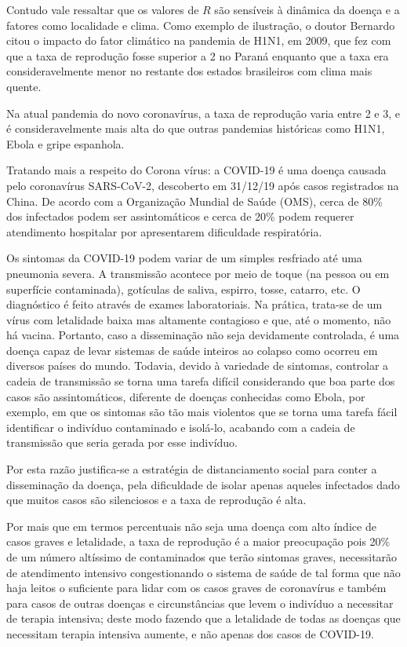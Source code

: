 \documentclass[
	12pt,				%
	openright,			%
	twoside,			%
	a4paper,			%
	english,			%
	brazil,				%
	svgnames
	]{abntex2}\usepackage[]{graphicx}\usepackage[]{color}
\begin{document}
Contudo vale ressaltar que os valores de $R$ são sensíveis à dinâmica da doença e a fatores como localidade e clima. Como exemplo de ilustração, o doutor Bernardo citou o impacto do fator climático na pandemia de H1N1, em 2009, que fez com que a taxa de reprodução fosse superior a 2 no Paraná enquanto que a taxa era consideravelmente menor no restante dos estados brasileiros com clima mais quente.



Na atual pandemia do novo coronavírus, a taxa de reprodução varia entre 2 e 3, e é consideravelmente mais alta do que outras pandemias históricas como H1N1, Ebola e gripe espanhola.



Tratando mais a respeito do Corona vírus: a COVID-19 é uma doença causada pelo coronavírus SARS-CoV-2, descoberto em 31/12/19 após casos registrados na China. De acordo com a Organização Mundial de Saúde (OMS), cerca de 80\% dos infectados podem ser assintomáticos e cerca de 20\% podem requerer atendimento hospitalar por apresentarem dificuldade respiratória. 



Os sintomas da COVID-19 podem variar de um simples resfriado até uma pneumonia severa. A transmissão acontece por meio de toque (na pessoa ou em superfície contaminada), gotículas de saliva, espirro, tosse, catarro, etc. O diagnóstico é feito através de exames laboratoriais.
Na prática, trata-se de um vírus com letalidade baixa mas altamente contagioso e que, até o momento, não há vacina. Portanto, caso a disseminação não seja devidamente controlada, é uma doença capaz de levar sistemas de saúde inteiros ao colapso como ocorreu em diversos países do mundo. Todavia, devido à variedade de sintomas, controlar a cadeia de transmissão se torna uma tarefa difícil considerando que boa parte dos casos são assintomáticos, diferente de doenças conhecidas como Ebola, por exemplo, em que os sintomas são tão mais violentos que se torna uma tarefa fácil identificar o indivíduo contaminado e isolá-lo, acabando com a cadeia de transmissão que seria gerada por esse indivíduo.



Por esta razão justifica-se a estratégia de distanciamento social para conter a disseminação da doença, pela dificuldade de isolar apenas aqueles infectados dado que muitos casos são silenciosos e a taxa de reprodução é alta.



Por mais que em termos percentuais não seja uma doença com alto índice de casos graves e letalidade, a taxa de reprodução é a maior preocupação pois 20\% de um número altíssimo de contaminados que terão sintomas graves, necessitarão de atendimento intensivo congestionando o sistema de saúde de tal forma que não haja leitos o suficiente para lidar com os casos graves de coronavírus e também para casos de outras doenças e circunstâncias que levem o indivíduo a necessitar de terapia intensiva; deste modo fazendo que a letalidade de todas as doenças que necessitam terapia intensiva aumente, e não apenas dos casos de COVID-19.
\end{document}
